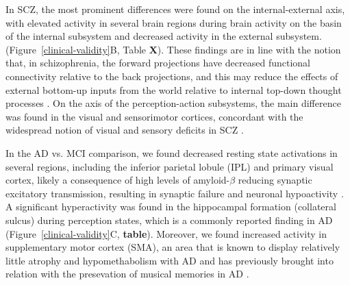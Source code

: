 \documentclass{article}
\begin{document}
In SCZ, the most prominent differences were found on the internal-external axis, with elevated activity in several brain regions during brain activity on the basin of the internal subsystem and decreased activity in the external subsystem. (Figure~\ref{clinical-validity}B, Table \textbf{X}). These findings are in line with the notion that, in schizophrenia, the forward projections have decreased functional connectivity relative to the back projections, and this may reduce the effects of external bottom-up inputs from the world relative to internal top-down thought processes \citep{rolls2021attractor}.
On the axis of the perception-action subsystems, the main difference was found in the visual and sensorimotor cortices, concordant with the widespread notion of visual and sensory deficits in SCZ \citep{javitt2009sensory, butler2008visual, adamek2022early}.

In the AD vs. MCI comparison, we found decreased resting state activations in several regions, including the inferior parietal lobule (IPL) and primary visual cortex, likely a consequence of high levels of amyloid-$\beta$ reducing synaptic excitatory transmission, resulting in synaptic failure and neuronal hypoactivity \citep{selkoe2002alzheimer}. A significant hyperactivity was found in the hippocampal formation (collateral sulcus) during perception states, which is
a commonly reported finding in AD \citep{aizenstein2015hippocampal, ewers2011neuroimaging}
(Figure~\ref{clinical-validity}C, \textbf{table}). Moreover, we found increased activity in supplementary motor cortex (SMA), an area that is known to display relatively little atrophy and hypomethabolism with AD and has previously brought into relation with the presevation of musical memories in AD \citep{jacobsen2015musical}.
\end{document}
